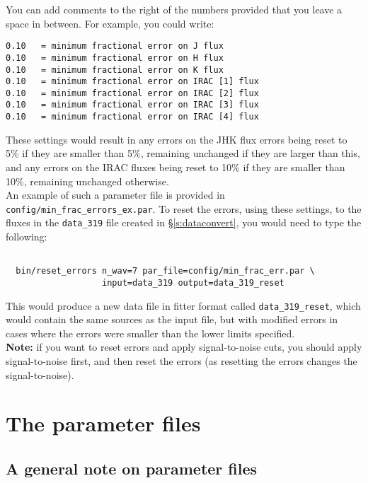 \documentclass[letterpaper,11pt]{report}
\begin{document}
You can add comments to the right of the numbers provided that you leave a space in between. For example, you could write:

\begin{verbatim}
0.10   = minimum fractional error on J flux
0.10   = minimum fractional error on H flux
0.10   = minimum fractional error on K flux
0.10   = minimum fractional error on IRAC [1] flux
0.10   = minimum fractional error on IRAC [2] flux
0.10   = minimum fractional error on IRAC [3] flux
0.10   = minimum fractional error on IRAC [4] flux
\end{verbatim}

These settings would result in any errors on the JHK flux errors being reset to 5\% if they are smaller than 5\%, remaining unchanged if they are larger than this, and any errors on the IRAC fluxes being reset to 10\% if they are smaller than 10\%, remaining unchanged otherwise.\\

An example of such a parameter file is provided in \texttt{config/min\_frac\_errors\_ex.par}. To reset the errors, using these settings, to the fluxes in the \texttt{data\_319} file created in \S\ref{s:dataconvert}, you would need to type the following:

\begin{Verbatim}[frame=single,label=Example]

  bin/reset_errors n_wav=7 par_file=config/min_frac_err.par \
                   input=data_319 output=data_319_reset

\end{Verbatim}

This would produce a new data file in fitter format called \texttt{data\_319\_reset}, which would contain the same sources as the input file, but with modified errors in cases where the errors were smaller than the lower limits specified.\\

{\color{red}
{\bf Note:} if you want to reset errors and apply signal-to-noise cuts, you should apply signal-to-noise first, and then reset the errors (as resetting the errors changes the signal-to-noise).
}

\chapter{The parameter files}

\section{A general note on parameter files}
\end{document}

